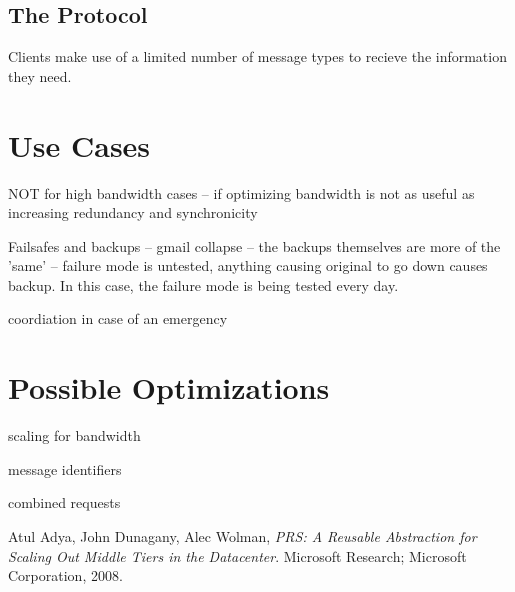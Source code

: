 \documentclass[11pt]{article}
\begin{document}
\subsection{The Protocol}

Clients make use of a limited number of message types to recieve the information they need.



\section{Use Cases}

NOT for high bandwidth cases -- if optimizing bandwidth is not as useful as increasing redundancy and synchronicity

Failsafes and backups -- gmail collapse -- the backups themselves are more of the 'same' -- failure mode is untested, anything causing original to go down causes backup.
In this case, the failure mode is being tested every day.

coordiation in case of an emergency

\section{Possible Optimizations}
scaling for bandwidth
   
message identifiers
   
combined requests

   
\begin{thebibliography}{1}

    Atul Adya, John Dunagany, Alec Wolman,
    \emph{PRS: A Reusable Abstraction for Scaling Out Middle Tiers in the Datacenter}.
    Microsoft Research; Microsoft Corporation,
    2008.
\end{thebibliography}
\end{document}
